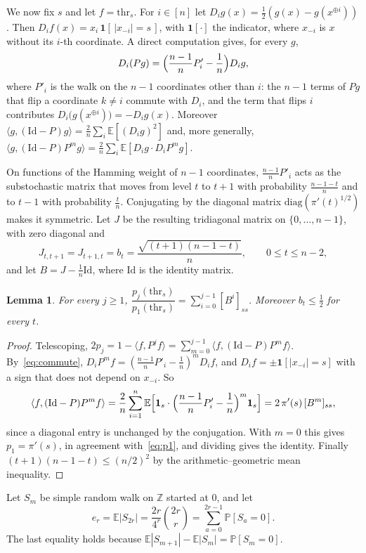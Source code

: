\documentclass[11pt]{amsart}
\newtheorem{lemma}{Lemma}[section]
\theoremstyle{remark}
\newcommand{\E}{\mathbb E}
\renewcommand{\P}{\mathbb P}
\newcommand{\thr}{\mathrm{thr}}
\begin{document}
We now fix $s$ and let $f=\thr_s$. For $i\in[n]$ let $D_ig(x)=\frac12(g(x)-g(x^{\oplus i}))$. Then $D_if(x)=x_i\,\mathbf 1[\,|x_{-i}|=s\,]$, with $\mathbf 1[\cdot]$ the indicator, where $x_{-i}$ is $x$ without its $i$-th coordinate. A direct computation gives, for every $g$,
\begin{equation}\label{eq:commute}
 D_i(Pg)=\Bigl(\frac{n-1}nP'_i-\frac1n\Bigr)D_ig,
\end{equation}
where $P'_i$ is the walk on the $n-1$ coordinates other than $i$: the $n-1$ terms of $Pg$ that flip a coordinate $k\ne i$ commute with $D_i$, and the term that flips $i$ contributes $D_i\bigl(g(x^{\oplus i})\bigr)=-D_ig(x)$. Moreover $\langle g,(\mathrm{Id}-P)g\rangle=\frac2n\sum_i\E[(D_ig)^2]$ and, more generally, $\langle g,(\mathrm{Id}-P)P^mg\rangle=\frac2n\sum_i\E[D_ig\cdot D_iP^mg]$.

On functions of the Hamming weight of $n-1$ coordinates, $\frac{n-1}nP'_i$ acts as the substochastic matrix that moves from level $t$ to $t+1$ with probability $\frac{n-1-t}n$ and to $t-1$ with probability $\frac tn$. Conjugating by the diagonal matrix $\mathrm{diag}(\pi'(t)^{1/2})$ makes it symmetric. Let $J$ be the resulting tridiagonal matrix on $\{0,\dots,n-1\}$, with zero diagonal and
\[
 J_{t,t+1}=J_{t+1,t}=b_t=\frac{\sqrt{(t+1)(n-1-t)}}n,\qquad 0\le t\le n-2,
\]
and let $B=J-\frac1n\mathrm{Id}$, where $\mathrm{Id}$ is the identity matrix.

\begin{lemma}\label{lem:tridiag}
For every $j\ge1$, $\dfrac{p_j(\thr_s)}{p_1(\thr_s)}=\sum_{i=0}^{j-1}[B^i]_{ss}$. Moreover $b_t\le\frac12$ for every $t$.
\end{lemma}

\begin{proof}
Telescoping, $2p_j=1-\langle f,P^jf\rangle=\sum_{m=0}^{j-1}\langle f,(\mathrm{Id}-P)P^mf\rangle$. By~\eqref{eq:commute}, $D_iP^mf=(\frac{n-1}nP'_i-\frac1n)^mD_if$, and $D_if=\pm\mathbf 1[|x_{-i}|=s]$ with a sign that does not depend on $x_{-i}$. So
\[
 \langle f,(\mathrm{Id}-P)P^mf\rangle=\frac2n\sum_{i=1}^n\E\Bigl[\mathbf 1_{s}\cdot\Bigl(\frac{n-1}nP'_i-\frac1n\Bigr)^m\mathbf 1_s\Bigr]=2\,\pi'(s)\,[B^m]_{ss},
\]
since a diagonal entry is unchanged by the conjugation. With $m=0$ this gives $p_1=\pi'(s)$, in agreement with~\eqref{eq:p1}, and dividing gives the identity. Finally $(t+1)(n-1-t)\le(n/2)^2$ by the arithmetic--geometric mean inequality.
\end{proof}

Let $S_m$ be simple random walk on $\mathbb Z$ started at $0$, and let
\[
 e_r=\E|S_{2r}|=\frac{2r}{4^r}\binom{2r}{r}=\sum_{a=0}^{2r-1}\P[S_a=0].
\]
The last equality holds because $\E|S_{m+1}|-\E|S_m|=\P[S_m=0]$.
\end{document}
